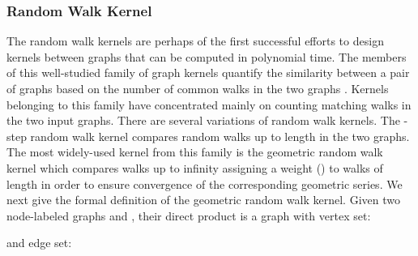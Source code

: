\documentclass[twoside,11pt]{article}
\begin{document}
\subsubsection{Random Walk Kernel}
The random walk kernels are perhaps of the first successful efforts to design kernels between graphs that can be computed in polynomial time.
The members of this well-studied family of graph kernels quantify the similarity between a pair of graphs based on the number of common walks in the two graphs \cite{kashima2003marginalized,gartner2003graph,mahe2004extensions,borgwardt2005protein,vishwanathan2010graph,sugiyama2015halting,zhang2018retgk}.
Kernels belonging to this family have concentrated mainly on counting matching walks in the two input graphs.
There are several variations of random walk kernels.
The -step random walk kernel compares random walks up to length  in the two graphs.
The most widely-used kernel from this family is the geometric random walk kernel \cite{gartner2003graph} which compares walks up to infinity assigning a weight  () to walks of length  in order to ensure convergence of the corresponding geometric series.
We next give the formal definition of the geometric random walk kernel.
Given two node-labeled graphs  and , their direct product  is a graph with vertex set:

and edge set:
\end{document}
